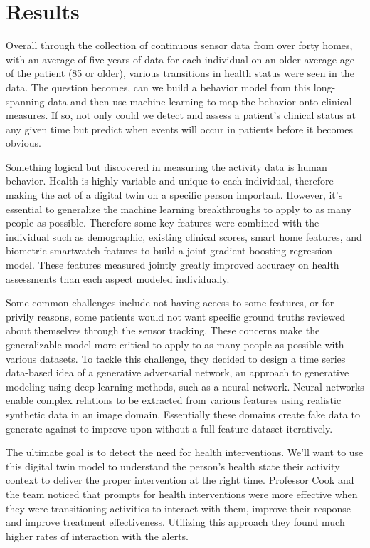 \documentclass[journal,onecolumn]{IEEEtran}
\begin{document}
\section{Results}

Overall through the collection of continuous sensor data from over forty homes, with an average of five years of data for each individual on an older average age of the patient (85 or older), various transitions in health status were seen in the data. The question becomes, can we build a behavior model from this long-spanning data and then use machine learning to map the behavior onto clinical measures. If so, not only could we detect and assess a patient's clinical status at any given time but predict when events will occur in patients before it becomes obvious. 

Something logical but discovered in measuring the activity data is human behavior. Health is highly variable and unique to each individual, therefore making the act of a digital twin on a specific person important. However, it's essential to generalize the machine learning breakthroughs to apply to as many people as possible. Therefore some key features were combined with the individual such as demographic, existing clinical scores, smart home features, and biometric smartwatch features to build a joint gradient boosting regression model. These features measured jointly greatly improved accuracy on health assessments than each aspect modeled individually. 

Some common challenges include not having access to some features, or for privily reasons, some patients would not want specific ground truths reviewed about themselves through the sensor tracking. These concerns make the generalizable model more critical to apply to as many people as possible with various datasets. To tackle this challenge, they decided to design a time series data-based idea of a generative adversarial network, an approach to generative modeling using deep learning methods, such as a neural network. Neural networks enable complex relations to be extracted from various features using realistic synthetic data in an image domain. Essentially these domains create fake data to generate against to improve upon without a full feature dataset iteratively. 

The ultimate goal is to detect the need for health interventions. We'll want to use this digital twin model to understand the person's health state their activity context to deliver the proper intervention at the right time. Professor Cook and the team noticed that prompts for health interventions were more effective when they were transitioning activities to interact with them, improve their response and improve treatment effectiveness. Utilizing this approach they found much higher rates of interaction with the alerts. 
\end{document}
